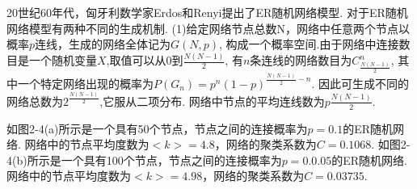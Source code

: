 \documentclass[bachelor,adobefonts]{jnuthesis}
\begin{document}
20世纪60年代，匈牙利数学家Erdos和Renyi提出了ER随机网络模型.
对于ER随机网络模型有两种不同的生成机制.
(1)给定网络节点总数N，网络中任意两个节点以概率$p$连线，生成的网络全体记为$G(N,p)$,
构成一个概率空间.由于网络中连接数目是一个随机变量$X$,取值可以从0到$\frac{N(N-1)}{2}$,
有$n$条连线的网络数目为$C_{\frac{N(N-1)}{2}}^{n}$,
其中一个特定网络出现的概率为$P(G_n) = p^n(1-p)^{\frac{N(N-1)}{2} - n}$.
因此可生成不同的网络总数为$2^{\frac{N(N-1)}{2}}$,它服从二项分布.
网络中节点的平均连线数为$p\frac{N(N-1)}{2}$.




如图2-4(a)所示是一个具有50个节点，节点之间的连接概率为$p = 0.1$的ER随机网络.
网络中的节点平均度数为$<k> = 4.8$，网络的聚类系数为$C = 0.1068$.
如图2-4(b)所示是一个具有100个节点，节点之间的连接概率为$p = 0.0.05$的ER随机网络.
网络中的节点平均度数为$<k> = 4.98$，网络的聚类系数为$C = 0.03735$.
\end{document}
